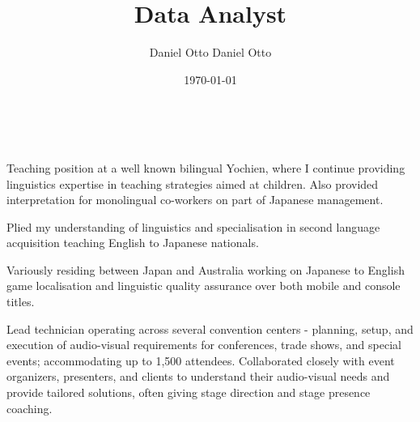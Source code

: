 \documentclass[10pt,a4paper,ragged2e,withhyper]{altacv}
\author{Daniel Otto Daniel Otto}
\date{\today}
\title{Data Analyst}
\begin{document}

\makecvheader

​\begin{paracol}{2}

\label{sec:org67ee2c3}
Teaching position at a well known bilingual Yochien, where I continue providing linguistics expertise in teaching strategies aimed at children. Also provided interpretation for monolingual co-workers on part of Japanese management.
\par\divider
{}
Plied my understanding of linguistics and specialisation in second language acquisition teaching English to Japanese nationals.
\par\divider
{}
Variously residing between Japan and Australia working on Japanese to English game localisation and linguistic quality assurance over both mobile and console titles.
\par\divider
{}
Lead technician operating across several convention centers - planning, setup, and execution of audio-visual requirements for conferences, trade shows, and special events; accommodating up to 1,500 attendees. Collaborated closely with event organizers, presenters, and clients to understand their audio-visual needs and provide tailored solutions, often giving stage direction and stage presence coaching.


\end{paracol}
\end{document}

